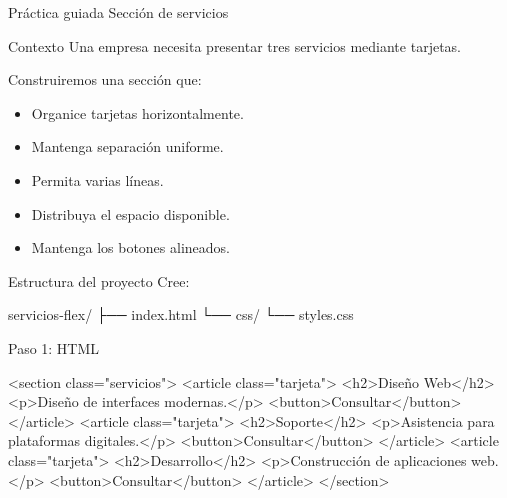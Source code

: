 \documentclass[aspectratio=169,11.5pt]{beamer}
\begin{document}
    \SectionSlide
    {Práctica guiada}
    {Sección de servicios}

    \begin{frame}{Contexto}
        Una empresa necesita presentar tres servicios
        mediante tarjetas.

        Construiremos una sección que:

        \begin{itemize}
            \item Organice tarjetas horizontalmente.
            \item Mantenga separación uniforme.
            \item Permita varias líneas.
            \item Distribuya el espacio disponible.
            \item Mantenga los botones alineados.
        \end{itemize}
    \end{frame}

    \begin{frame}[fragile]{Estructura del proyecto}
        Cree:

        \begin{bashcodedark}
            servicios-flex/
            ├── index.html
            └── css/
            └── styles.css
        \end{bashcodedark}
    \end{frame}

    \begin{frame}[fragile]{Paso 1: HTML}
        \begin{htmlcodedark}
    <section class="servicios">
        <article class="tarjeta">
            <h2>Diseño Web</h2>
            <p>Diseño de interfaces modernas.</p>
            <button>Consultar</button>
        </article>
        <article class="tarjeta">
            <h2>Soporte</h2>
            <p>Asistencia para plataformas digitales.</p>
            <button>Consultar</button>
        </article>
        <article class="tarjeta">
            <h2>Desarrollo</h2>
            <p>Construcción de aplicaciones web.</p>
            <button>Consultar</button>
        </article>
    </section>
        \end{htmlcodedark}
    \end{frame}
\end{document}
